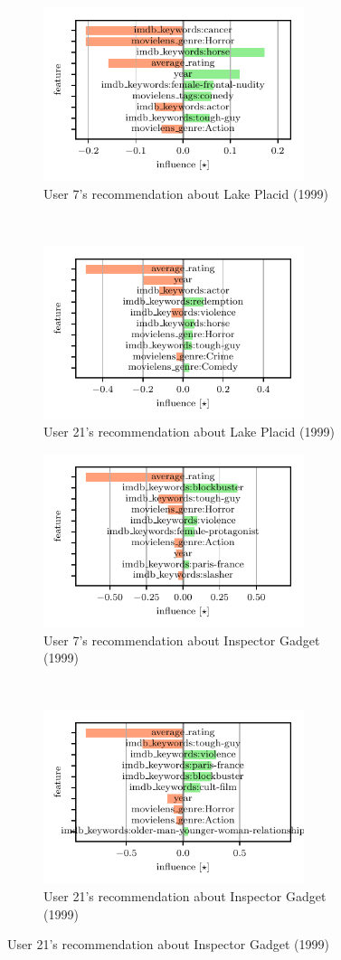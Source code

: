 \begin{figure}[t!]
  \centering
  \begin{subfigure}[t]{0.45\textwidth}
    \includegraphics[width=3in]{figures/qii_user_7_movie_2713_real_data.pdf}
    \caption{User 7's recommendation about Lake Placid (1999)}
  \end{subfigure}~
  \begin{subfigure}[t]{0.45\textwidth}
    \includegraphics[width=3in]{figures/qii_user_21_movie_2713_real_data.pdf}
    \caption{User 21's recommendation about Lake Placid (1999)}
  \end{subfigure}

  \begin{subfigure}[t]{0.45\textwidth}
    \includegraphics[width=3in]{figures/qii_user_7_movie_2720_real_data.pdf}
    \caption{User 7's recommendation about Inspector Gadget (1999)}
  \end{subfigure} ~
  \begin{subfigure}[t]{0.45\textwidth}
    \includegraphics[width=3in]{figures/qii_user_21_movie_2720_real_data.pdf}
    \caption{User 21's recommendation about Inspector Gadget (1999)}
  \end{subfigure}



\end{figure}
